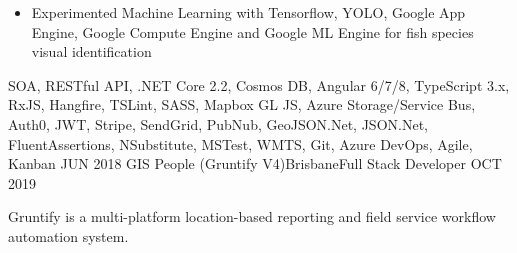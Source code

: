 \begin{experiences}
{\begin{itemize}
                        \item Experimented Machine Learning with Tensorflow, YOLO, Google App Engine, Google Compute Engine and Google ML Engine for fish species visual identification
                      \end{itemize}
                    }
                    {SOA, RESTful API, .NET Core 2.2, Cosmos DB, Angular 6/7/8, TypeScript 3.x, RxJS, Hangfire, TSLint, SASS, Mapbox GL JS, Azure Storage/Service Bus, Auth0, JWT, Stripe, SendGrid, PubNub, GeoJSON.Net, JSON.Net, FluentAssertions, NSubstitute, MSTest, WMTS, Git, Azure DevOps, Agile, Kanban}
    \emptySeparator
    \experience
    {JUN 2018}   {GIS People (Gruntify V4)}{Brisbane}{Full Stack Developer}
    {OCT 2019} {
                    Gruntify is a multi-platform location-based reporting and field service workflow automation system.
                    
}
\end{experiences}
